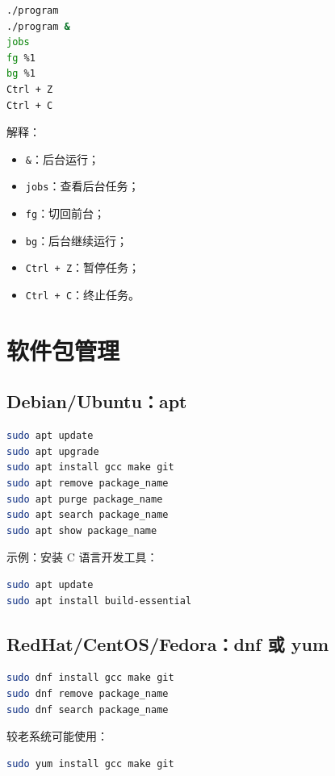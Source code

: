 \documentclass[UTF8,a4paper,12pt]{ctexart}
\begin{document}
\begin{lstlisting}[language=bash]
./program
./program &
jobs
fg %1
bg %1
Ctrl + Z
Ctrl + C
\end{lstlisting}

解释：
\begin{itemize}
    \item \texttt{\&}：后台运行；
    \item \texttt{jobs}：查看后台任务；
    \item \texttt{fg}：切回前台；
    \item \texttt{bg}：后台继续运行；
    \item \texttt{Ctrl + Z}：暂停任务；
    \item \texttt{Ctrl + C}：终止任务。
\end{itemize}

\section{软件包管理}

\subsection{Debian/Ubuntu：apt}

\begin{lstlisting}[language=bash]
sudo apt update
sudo apt upgrade
sudo apt install gcc make git
sudo apt remove package_name
sudo apt purge package_name
sudo apt search package_name
sudo apt show package_name
\end{lstlisting}

示例：安装 C 语言开发工具：

\begin{lstlisting}[language=bash]
sudo apt update
sudo apt install build-essential
\end{lstlisting}

\subsection{RedHat/CentOS/Fedora：dnf 或 yum}

\begin{lstlisting}[language=bash]
sudo dnf install gcc make git
sudo dnf remove package_name
sudo dnf search package_name
\end{lstlisting}

较老系统可能使用：

\begin{lstlisting}[language=bash]
sudo yum install gcc make git
\end{lstlisting}
\end{document}

